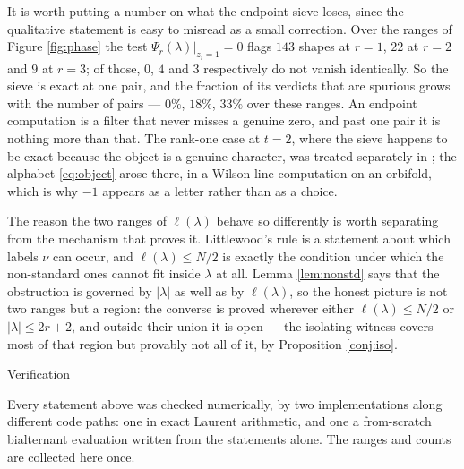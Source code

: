 \documentclass[11pt,reqno]{amsart}
\makeatletter
\renewcommand\section{\@startsection{section}{1}%
  \z@{\linespacing\@plus\linespacing}{.5\linespacing}%
  {\normalfont\large\bfseries\centering}}
\theoremstyle{plain}
\theoremstyle{definition}
\makeatother
\begin{document}
It is worth putting a number on what the endpoint sieve loses, since the qualitative statement is
easy to misread as a small correction. Over the ranges of Figure \ref{fig:phase} the test
$\Psi_r(\lambda)|_{z_i=1}=0$ flags $143$ shapes at $r=1$, $22$ at $r=2$ and $9$ at $r=3$; of those,
$0$, $4$ and $3$ respectively do not vanish identically. So the sieve is exact at one pair, and the
fraction of its verdicts that are spurious grows with the number of pairs --- $0\%$, $18\%$, $33\%$
over these ranges. An endpoint computation is a filter that never misses a genuine zero, and past one
pair it is nothing more than that. The rank-one case at $t=2$, where the sieve happens to be exact
because the object is a genuine character, was treated separately in \cite{Mar26}; the alphabet
\eqref{eq:object} arose there, in a Wilson-line computation on an orbifold, which is why $-1$ appears
as a letter rather than as a choice.

The reason the two ranges of $\ell(\lambda)$ behave so differently is worth separating from the
mechanism that proves it. Littlewood's rule is a statement about which labels $\nu$ can occur, and
$\ell(\lambda)\le N/2$ is exactly the condition under which the non-standard ones cannot fit inside
$\lambda$ at all. Lemma \ref{lem:nonstd} says that the obstruction is governed by $|\lambda|$ as well
as by $\ell(\lambda)$, so the honest picture is not two ranges but a region: the converse is proved
wherever either $\ell(\lambda)\le N/2$ or $|\lambda|\le2r+2$, and outside their union it is open ---
the isolating witness covers most of that region but provably not all of it, by Proposition
\ref{conj:iso}.

\section{Verification}\label{sec:verif}

Every statement above was checked numerically, by two implementations along different code paths: one
in exact Laurent arithmetic, and one a from-scratch bialternant evaluation written from the
statements alone. The ranges and counts are collected here once.
\end{document}
